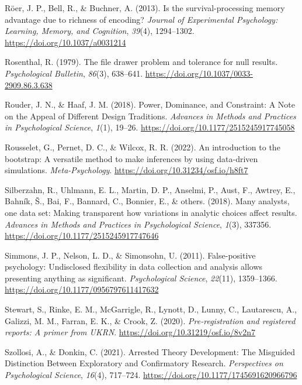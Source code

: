 \documentclass[
  man]{apa7}
\newlength{\cslhangindent}
\newenvironment{CSLReferences}[2] %
 {\begin{list}{}{%
  \setlength{\itemindent}{0pt}
  \setlength{\leftmargin}{0pt}
  \setlength{\parsep}{0pt}
  \ifodd #1
   \setlength{\leftmargin}{\cslhangindent}
   \setlength{\itemindent}{-1\cslhangindent}
  \fi
  \setlength{\itemsep}{#2\baselineskip}}}
 {\end{list}}
\begin{document}
\begin{CSLReferences}{1}{0}
Röer, J. P., Bell, R., \& Buchner, A. (2013). Is the survival-processing memory advantage due to richness of encoding? \emph{Journal of Experimental Psychology: Learning, Memory, and Cognition}, \emph{39}(4), 1294--1302. \url{https://doi.org/10.1037/a0031214}

Rosenthal, R. (1979). The file drawer problem and tolerance for null results. \emph{Psychological Bulletin}, \emph{86}(3), 638--641. \url{https://doi.org/10.1037/0033-2909.86.3.638}

Rouder, J. N., \& Haaf, J. M. (2018). Power, Dominance, and Constraint: A Note on the Appeal of Different Design Traditions. \emph{Advances in Methods and Practices in Psychological Science}, \emph{1}(1), 19--26. \url{https://doi.org/10.1177/2515245917745058}

Rousselet, G., Pernet, D. C., \& Wilcox, R. R. (2022). An introduction to the bootstrap: A versatile method to make inferences by using data-driven simulations. \emph{Meta-Psychology}. \url{https://doi.org/10.31234/osf.io/h8ft7}

Silberzahn, R., Uhlmann, E. L., Martin, D. P., Anselmi, P., Aust, F., Awtrey, E., Bahník, Š., Bai, F., Bannard, C., Bonnier, E., \& others. (2018). Many analysts, one data set: Making transparent how variations in analytic choices affect results. \emph{Advances in Methods and Practices in Psychological Science}, \emph{1}(3), 337356. \url{https://doi.org/10.1177/2515245917747646}

Simmons, J. P., Nelson, L. D., \& Simonsohn, U. (2011). False-positive psychology: Undisclosed flexibility in data collection and analysis allows presenting anything as significant. \emph{Psychological Science}, \emph{22}(11), 1359--1366. \url{https://doi.org/10.1177/0956797611417632}

Stewart, S., Rinke, E. M., McGarrigle, R., Lynott, D., Lunny, C., Lautarescu, A., Galizzi, M. M., Farran, E. K., \& Crook, Z. (2020). \emph{Pre-registration and registered reports: A primer from UKRN}. \url{https://doi.org/10.31219/osf.io/8v2n7}

Szollosi, A., \& Donkin, C. (2021). Arrested Theory Development: The Misguided Distinction Between Exploratory and Confirmatory Research. \emph{Perspectives on Psychological Science}, \emph{16}(4), 717--724. \url{https://doi.org/10.1177/1745691620966796}


\end{CSLReferences}
\end{document}
